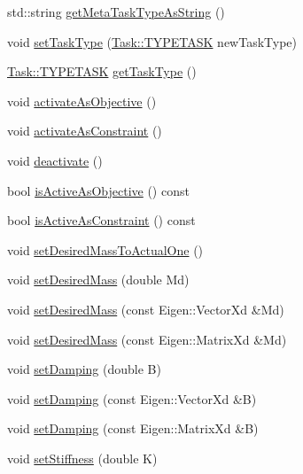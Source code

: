 \begin{DoxyCompactItemize}
\item 
std\+::string \hyperlink{classocra_1_1Task_a957707b86aa3fdc088040485ab9269ed}{get\+Meta\+Task\+Type\+As\+String} ()
\item 
void \hyperlink{classocra_1_1Task_a8292d37db712589e90d628d9b1e3e1ea}{set\+Task\+Type} (\hyperlink{classocra_1_1Task_ad9d224cf787aa61c098f282efb78254a}{Task\+::\+T\+Y\+P\+E\+T\+A\+SK} new\+Task\+Type)
\item 
\hyperlink{classocra_1_1Task_ad9d224cf787aa61c098f282efb78254a}{Task\+::\+T\+Y\+P\+E\+T\+A\+SK} \hyperlink{classocra_1_1Task_a1fed0d65711edfdc4b9e83c292b147f8}{get\+Task\+Type} ()
\item 
void \hyperlink{classocra_1_1Task_a30cf51c067e6bac56a7b2184fa880bbe}{activate\+As\+Objective} ()
\item 
void \hyperlink{classocra_1_1Task_a4f7b62e14ba71899991eaf4522d31a90}{activate\+As\+Constraint} ()
\item 
void \hyperlink{classocra_1_1Task_abb7309429225e72998ede63fdb2cc713}{deactivate} ()
\item 
bool \hyperlink{classocra_1_1Task_aa0753ae62d1996fc802320456dbfc1fb}{is\+Active\+As\+Objective} () const
\item 
bool \hyperlink{classocra_1_1Task_afc9711292ed2b81d803003191f7ec6a1}{is\+Active\+As\+Constraint} () const
\item 
void \hyperlink{classocra_1_1Task_aa1b8236efcfba897ca6a684226a338ae}{set\+Desired\+Mass\+To\+Actual\+One} ()
\item 
void \hyperlink{classocra_1_1Task_a31055e4bfc91407ef5ed6f0d200afe77}{set\+Desired\+Mass} (double Md)
\item 
void \hyperlink{classocra_1_1Task_ad6a82a5166195be0080f7d33b628d9df}{set\+Desired\+Mass} (const Eigen\+::\+Vector\+Xd \&Md)
\item 
void \hyperlink{classocra_1_1Task_aa7a0800fcb7c9b7ea9d72de05efa4db7}{set\+Desired\+Mass} (const Eigen\+::\+Matrix\+Xd \&Md)
\item 
void \hyperlink{classocra_1_1Task_a51509c15751c0fc8c40bf4b2328d7b21}{set\+Damping} (double B)
\item 
void \hyperlink{classocra_1_1Task_ab5fd8e11eea7dbccb7169282c9be4b0a}{set\+Damping} (const Eigen\+::\+Vector\+Xd \&B)
\item 
void \hyperlink{classocra_1_1Task_a5dd04fe71a38907391b1b4885df2c86a}{set\+Damping} (const Eigen\+::\+Matrix\+Xd \&B)
\item 
void \hyperlink{classocra_1_1Task_a9b132099233731049473a54fc53a29ac}{set\+Stiffness} (double K)

\end{DoxyCompactItemize}
